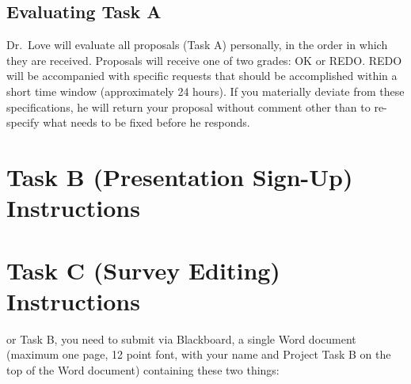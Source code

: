 \documentclass[]{book}
\theoremstyle{definition}
\theoremstyle{definition}
\theoremstyle{definition}
\theoremstyle{remark}
\begin{document}
\hypertarget{evaluating-task-a}{%
\section{Evaluating Task A}\label{evaluating-task-a}}

Dr.~Love will evaluate all proposals (Task A) personally, in the order
in which they are received. Proposals will receive one of two grades: OK
or REDO. REDO will be accompanied with specific requests that should be
accomplished within a short time window (approximately 24 hours). If you
materially deviate from these specifications, he will return your
proposal without comment other than to re-specify what needs to be fixed
before he responds.

\hypertarget{task-b-presentation-sign-up-instructions}{%
\chapter{Task B (Presentation Sign-Up)
Instructions}\label{task-b-presentation-sign-up-instructions}}

\hypertarget{task-c-survey-editing-instructions}{%
\chapter{Task C (Survey Editing)
Instructions}\label{task-c-survey-editing-instructions}}

or Task B, you need to submit via Blackboard, a single Word document
(maximum one page, 12 point font, with your name and Project Task B on
the top of the Word document) containing these two things:
\end{document}
